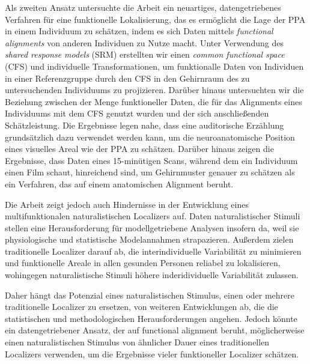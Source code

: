 Als zweiten Ansatz untersuchte die Arbeit ein neuartiges, datengetriebenes
Verfahren für eine funktionelle Lokalisierung, das es ermöglicht die Lage der
PPA in einem Individuum zu schätzen, indem es sich Daten mittels
\textit{functional alignments} von anderen Individuen zu Nutze macht.
%
Unter Verwendung des \textit{shared response models} (SRM) erstellten  wir
einen \textit{common functional space} (CFS) und individuelle Transformationen,
um funktionalle Daten von Individuen in einer Referenzgruppe durch den CFS in
den Gehirnraum des zu untersuchenden Individuums zu projizieren.
%
Darüber hinaus untersuchten wir die Beziehung zwischen der Menge funktioneller
Daten, die für das Alignments eines Individuums mit dem CFS genutzt wurden und
der sich anschließenden Schätzleistung.
Die Ergebnisse legen nahe, dass eine auditorische Erzählung grundsätzlich dazu
verwendet werden kann, um die neuroanatomische Position eines visuelles Areal
wie der PPA zu schätzen.
%
Darüber hinaus zeigen die Ergebnisse, dass Daten eines 15-minütigen Scans,
während dem ein Individuum einen Film schaut, hinreichend sind, um Gehirnmuster
genauer zu schätzen als ein Verfahren, das auf einem anatomischen Alignment beruht.

Die Arbeit zeigt jedoch auch Hindernisse in der Entwicklung eines
multifunktionalen naturalistischen Localizers auf.
%
Daten naturalistischer Stimuli stellen eine Herausforderung für
modellgetriebene Analysen insofern da, weil sie physiologische und statistische
Modelannahmen strapazieren.
%
Außerdem zielen traditionelle Localizer darauf ab, die interindividuelle
Variabilität zu minimieren und funktionelle Areale in allen gesunden Personen
reliabel zu lokalisieren, wohingegen naturalistische Stimuli höhere
inderidividuelle Variabilität zulassen.

Daher hängt das Potenzial eines naturalistischen Stimulus, einen oder mehrere
traditionelle Localizer zu ersetzen, von weiteren Entwicklungen ab, die die
statistischen und methodologischen Herausforderungen angehen.
%
Jedoch könnte ein datengetriebener Ansatz, der auf functional
alignment beruht, möglicherweise einen naturalistischen Stimulus von ähnlicher 
Dauer eines traditionellen Localizers verwenden, um die Ergebnisse vieler 
funktioneller Localizer schätzen.
